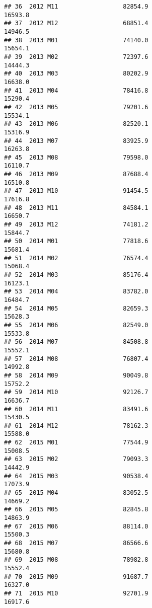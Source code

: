 \documentclass[
]{article}
\begin{document}
\begin{verbatim}
## 36  2012 M11                  82854.9                         16593.8
## 37  2012 M12                  68851.4                         14946.5
## 38  2013 M01                  74140.0                         15654.1
## 39  2013 M02                  72397.6                         14444.3
## 40  2013 M03                  80202.9                         16638.0
## 41  2013 M04                  78416.8                         15290.4
## 42  2013 M05                  79201.6                         15534.1
## 43  2013 M06                  82520.1                         15316.9
## 44  2013 M07                  83925.9                         16263.8
## 45  2013 M08                  79598.0                         16110.7
## 46  2013 M09                  87688.4                         16510.8
## 47  2013 M10                  91454.5                         17616.8
## 48  2013 M11                  84584.1                         16650.7
## 49  2013 M12                  74181.2                         15844.7
## 50  2014 M01                  77818.6                         15681.4
## 51  2014 M02                  76574.4                         15068.4
## 52  2014 M03                  85176.4                         16123.1
## 53  2014 M04                  83782.0                         16484.7
## 54  2014 M05                  82659.3                         15628.3
## 55  2014 M06                  82549.0                         15533.8
## 56  2014 M07                  84508.8                         15552.1
## 57  2014 M08                  76807.4                         14992.8
## 58  2014 M09                  90049.8                         15752.2
## 59  2014 M10                  92126.7                         16636.7
## 60  2014 M11                  83491.6                         15430.5
## 61  2014 M12                  78162.3                         15588.0
## 62  2015 M01                  77544.9                         15008.5
## 63  2015 M02                  79093.3                         14442.9
## 64  2015 M03                  90538.4                         17073.9
## 65  2015 M04                  83052.5                         14669.2
## 66  2015 M05                  82845.8                         14863.9
## 67  2015 M06                  88114.0                         15500.3
## 68  2015 M07                  86566.6                         15680.8
## 69  2015 M08                  78982.8                         15552.4
## 70  2015 M09                  91687.7                         16327.0
## 71  2015 M10                  92701.9                         16917.6

\end{verbatim}
\end{document}
